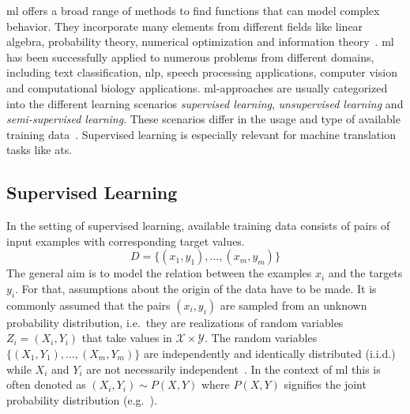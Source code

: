 \gls{ml} offers a broad range of methods to find functions that can model complex behavior.
They incorporate many elements from different fields like linear algebra, probability theory, numerical optimization and information theory~\autocite{Goodfellow-et-al-2016}.
\gls{ml} has been successfully applied to numerous problems from different domains, including text classification, \gls{nlp}, speech processing applications, computer vision and computational biology applications.
\gls{ml}-approaches are usually categorized into the different learning scenarios \textit{supervised learning}, \textit{unsupervised learning} and \textit{semi-supervised learning}.
These scenarios differ in the usage and type of available training data~\autocite{mohri2018foundations}.
Supervised learning is especially relevant for machine translation tasks like \gls{ats}.

\subsection{Supervised Learning}\label{subsec:supervised-learning}
In the setting of supervised learning, available training data consists of pairs of input examples with corresponding target values.
\[
    D = \{(x_1, y_1), \dots, (x_m, y_m)\}
\]
The general aim is to model the relation between the examples $x_i$ and the targets $y_i$.
For that, assumptions about the origin of the data have to be made.
It is commonly assumed that the pairs $(x_i, y_i)$ are sampled from an unknown probability distribution, i.e.\ they are realizations of random variables $Z_i = (X_i, Y_i)$ that take values in $\mathcal{X} \times \mathcal{Y}$.
The random variables $\{(X_1, Y_1), \dots ,(X_m, Y_m)\}$ are independently and identically distributed (i.i.d.) while $X_i$ and $Y_i$ are not necessarily independent~\autocite{gressmann2019probabilistic}.
In the context of \gls{ml} this is often denoted as $(X_i,Y_i) \sim P(X, Y)$ where $P(X, Y)$ signifies the joint probability distribution (e.g.\ \textcite{Goodfellow-et-al-2016}).

